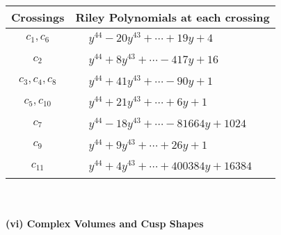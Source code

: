 \documentclass[1p]{elsarticle_modified}
\theoremstyle{definition}
\begin{document}
\begin{tabular}{m{50pt}|m{274pt}}
Crossings & \hspace{64pt}Riley Polynomials at each crossing \\
\hline $$\begin{aligned}c_{1},c_{6}\end{aligned}$$&$\begin{aligned}
&y^{44}-20 y^{43}+\cdots+19 y+4
\end{aligned}$\\
\hline $$\begin{aligned}c_{2}\end{aligned}$$&$\begin{aligned}
&y^{44}+8 y^{43}+\cdots-417 y+16
\end{aligned}$\\
\hline $$\begin{aligned}c_{3},c_{4},c_{8}\end{aligned}$$&$\begin{aligned}
&y^{44}+41 y^{43}+\cdots-90 y+1
\end{aligned}$\\
\hline $$\begin{aligned}c_{5},c_{10}\end{aligned}$$&$\begin{aligned}
&y^{44}+21 y^{43}+\cdots+6 y+1
\end{aligned}$\\
\hline $$\begin{aligned}c_{7}\end{aligned}$$&$\begin{aligned}
&y^{44}-18 y^{43}+\cdots-81664 y+1024
\end{aligned}$\\
\hline $$\begin{aligned}c_{9}\end{aligned}$$&$\begin{aligned}
&y^{44}+9 y^{43}+\cdots+26 y+1
\end{aligned}$\\
\hline $$\begin{aligned}c_{11}\end{aligned}$$&$\begin{aligned}
&y^{44}+4 y^{43}+\cdots+400384 y+16384
\end{aligned}$\\
\hline
\end{tabular}\\~\\
\newpage\flushleft \textbf{(vi) Complex Volumes and Cusp Shapes}
\end{document}
